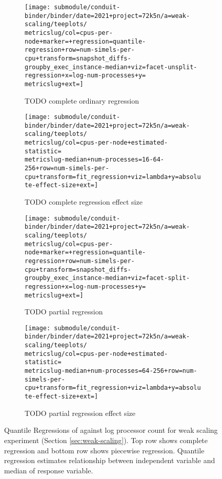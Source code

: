 \begin{figure*}
  \centering

  \begin{subfigure}[b]{0.5\textwidth}
    \centering
    \texttt{[image: submodule/conduit-binder/binder/date=2021+project=72k5n/a=weak-scaling/teeplots/\\metricslug/col=cpus-per-node+marker=+regression=quantile-regression+row=num-simels-per-cpu+transform=snapshot\_diffs-groupby\_exec\_instance-median+viz=facet-unsplit-regression+x=log-num-processes+y=\\metricslug+ext=]}
    \caption{TODO complete ordinary regression}
    \label{fig:weak-scaling-regression-quantile-\metricslug-complete-regression}
  \end{subfigure}%
  \begin{subfigure}[b]{0.5\textwidth}
    \centering
    \texttt{[image: submodule/conduit-binder/binder/date=2021+project=72k5n/a=weak-scaling/teeplots/\\metricslug/col=cpus-per-node+estimated-statistic=\\metricslug-median+num-processes=16-64-256+row=num-simels-per-cpu+transform=fit\_regression+viz=lambda+y=absolute-effect-size+ext=]}
    \caption{TODO complete regression effect size}
    \label{fig:weak-scaling-regression-quantile-\metricslug-complete-effect-size}
  \end{subfigure}

  \begin{subfigure}[b]{0.5\textwidth}
    \centering
    \texttt{[image: submodule/conduit-binder/binder/date=2021+project=72k5n/a=weak-scaling/teeplots/\\metricslug/col=cpus-per-node+marker=+regression=quantile-regression+row=num-simels-per-cpu+transform=snapshot\_diffs-groupby\_exec\_instance-median+viz=facet-split-regression+x=log-num-processes+y=\\metricslug+ext=]}
    \caption{TODO partial regression}
    \label{fig:weak-scaling-regression-quantile-\metricslug-partial-regression}
  \end{subfigure}%
  \begin{subfigure}[b]{0.5\textwidth}
    \centering
    \texttt{[image: submodule/conduit-binder/binder/date=2021+project=72k5n/a=weak-scaling/teeplots/\\metricslug/col=cpus-per-node+estimated-statistic=\\metricslug-median+num-processes=64-256+row=num-simels-per-cpu+transform=fit\_regression+viz=lambda+y=absolute-effect-size+ext=]}
    \caption{TODO partial regression effect size}
    \label{fig:weak-scaling-regression-quantile-\metricslug-partial-effect-size}
  \end{subfigure}
  \caption{
  Quantile Regressions of \metric{} against log processor count for weak scaling experiment (Section \ref{sec:weak-scaling}).
  Top row shows complete regression and bottom row shows piecewise regression.
  Quantile regression estimates relationship between independent variable and median of response variable.
  }
  \label{fig:weak-scaling-regression-quantile-\metricslug}
\end{figure*}
